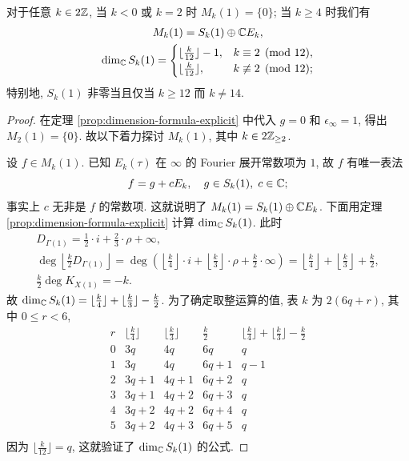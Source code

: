 \begin{theorem}\label{prop:dimension-full}
	对于任意 $k \in 2\mathbb{Z}$, 当 $k < 0$ 或  $k = 2$ 时 $M_k(1) = \{0\}$; 当 $k \geq 4$ 时我们有
	\begin{gather*}
		M_k(1) = S_k(1) \oplus \mathbb{C} E_k, \\
		\dim_{\mathbb{C}} S_k(1) = \begin{cases}
			\lfloor \frac{k}{12} \rfloor - 1, & k \equiv 2 \pmod {12}, \\
			\lfloor \frac{k}{12} \rfloor, & k \not\equiv 2 \pmod {12};
		\end{cases}
	\end{gather*}
	特别地, $S_k(1)$ 非零当且仅当 $k \geq 12$ 而 $k \neq 14$.
\end{theorem}
\begin{proof}
	在定理 \ref{prop:dimension-formula-explicit} 中代入 $g=0$ 和 $\epsilon_\infty=1$, 得出 $M_2(1) = \{0\}$. 故以下着力探讨 $M_k(1)$, 其中 $k \in 2\mathbb{Z}_{\geq 2}$.
	
	设 $f \in M_k(1)$. 已知 $E_k(\tau)$ 在 $\infty$ 的 Fourier 展开常数项为 $1$, 故 $f$ 有唯一表法
	\[ f = g + c E_k, \quad g \in S_k(1), \; c \in \mathbb{C}; \]
	事实上 $c$ 无非是 $f$ 的常数项. 这就说明了 $M_k(1) = S_k(1) \oplus \mathbb{C} E_k$. 下面用定理 \ref{prop:dimension-formula-explicit} 计算 $\dim_{\mathbb{C}} S_k(1)$. 此时
	\begin{gather*}
		D_{\Gamma(1)} = \frac{1}{2} \cdot i + \frac{2}{3} \cdot \rho + \infty, \\
		\deg \left\lfloor \frac{k}{2} D_{\Gamma(1)} \right\rfloor = \deg\left( \left\lfloor\frac{k}{4}\right\rfloor \cdot i + \left\lfloor\frac{k}{3}\right\rfloor \cdot \rho + \frac{k}{2} \cdot \infty \right) = \left\lfloor\frac{k}{4}\right\rfloor + \left\lfloor\frac{k}{3}\right\rfloor + \frac{k}{2}, \\
		\frac{k}{2} \deg K_{X(1)} = -k.
	\end{gather*}
	故 $\dim_{\mathbb{C}} S_k(1) = \lfloor\frac{k}{4}\rfloor + \lfloor\frac{k}{3}\rfloor - \frac{k}{2}$. 为了确定取整运算的值, 表 $k$ 为 $2(6q + r)$, 其中 $0 \leq r < 6$,
	\[\begin{array}{c|c|c|c|c}
		r & \lfloor \frac{k}{4} \rfloor & \lfloor \frac{k}{3} \rfloor & \frac{k}{2} & \lfloor\frac{k}{4}\rfloor + \lfloor\frac{k}{3}\rfloor - \frac{k}{2} \\ \hline
		0 & 3q & 4q & 6q & q \\
		1 & 3q & 4q & 6q+1 & q-1 \\
		2 & 3q+1 & 4q+1 & 6q+2 & q \\
		3 & 3q+1 & 4q+2 & 6q+3 & q \\
		4 & 3q+2 & 4q+2 & 6q+4 & q \\
		5 & 3q+2 & 4q+3 & 6q+5& q \\
	\end{array}\]
	因为 $\lfloor \frac{k}{12} \rfloor = q$, 这就验证了 $\dim_{\mathbb{C}} S_k(1)$ 的公式.
\end{proof}

